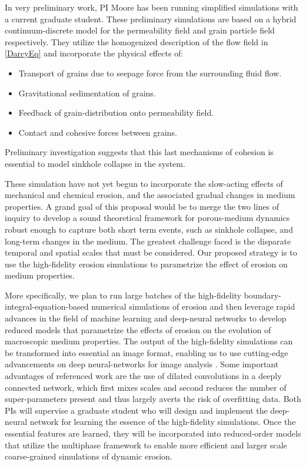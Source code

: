 \documentclass[11pt]{article}
\begin{document}
	In very preliminary work, PI Moore has been running simplified simulations with a current graduate student. These preliminary simulations are based on a hybrid continuum-discrete model for the permeability field and grain particle field respectively. They utilize the homogenized description of the flow field in \eqref{DarcyEq} and incorporate the physical effects of:
\begin{itemize}[noitemsep]
\item Transport of grains due to seepage force from the surrounding fluid flow.
\item Gravitational sedimentation of grains.
\item Feedback of grain-distribution onto permeability field.
\item Contact and cohesive forces between grains.
\end{itemize}
Preliminary investigation suggests that this last mechanisms of cohesion is essential to model sinkhole collapse in the system.

These simulation have not yet begun to incorporate the slow-acting effects of mechanical and chemical erosion, and the associated gradual changes in medium properties. A grand goal of this proposal would be to merge the two lines of inquiry to develop a sound theoretical framework for porous-medium dynamics robust enough to capture both short term events, such as sinkhole collapse, and long-term changes in the medium. The greatest challenge faced is the disparate temporal and spatial scales that must be considered. Our proposed strategy is to use the high-fidelity erosion simulations to parametrize the effect of erosion on medium properties.

	More specifically, we plan to run large batches of the high-fidelity boundary-integral-equation-based numerical simulations of erosion and then leverage rapid advances in the field of machine learning and deep-neural networks to develop reduced models that parametrize the effects of erosion on the evolution of macroscopic medium properties. The output of the high-fidelity simulations can be transformed into essential an image format, enabling us to use cutting-edge advancements on deep neural-networks for image analysis \cite{pelt2018mixed}. Some important advantages of referenced work are the use of dilated convolutions in a deeply connected network, which first mixes scales and second reduces the number of super-parameters present and thus largely averts the risk of overfitting data. Both PIs will supervise a graduate student who will design and implement the deep-neural network for learning the essence of the high-fidelity simulations. Once the essential features are learned, they will be incorporated into reduced-order models that utilize the multiphase framework to enable more efficient and larger scale coarse-grained simulations of dynamic erosion.
\end{document}
